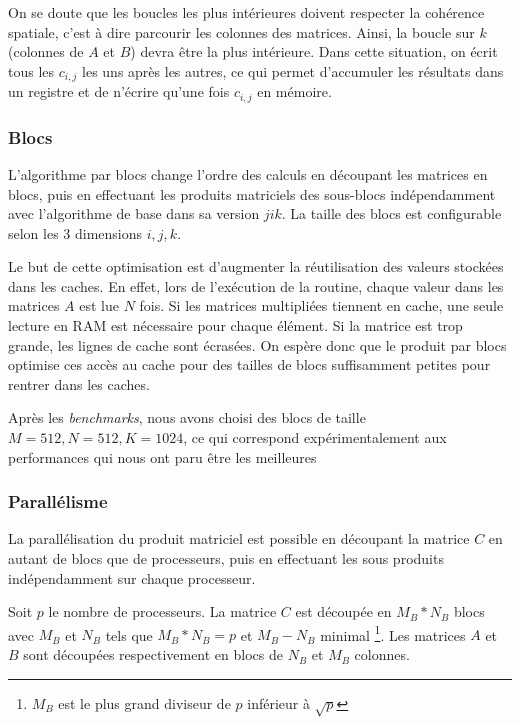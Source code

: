 On se doute que les boucles les plus intérieures doivent respecter la cohérence spatiale, c'est à dire parcourir les colonnes des matrices. Ainsi, la boucle sur $k$ (colonnes de $A$ et $B$) devra être la plus intérieure. Dans cette situation, on écrit tous les $c_{i,j}$ les uns après les autres, ce qui permet d'accumuler les résultats dans un registre et de n'écrire qu'une fois $c_{i,j}$ en mémoire.

\subsubsection{Blocs}\label{sec:algo_bloc}

L'algorithme par blocs change l'ordre des calculs en découpant les matrices en blocs, puis en effectuant les produits matriciels des sous-blocs indépendamment avec l'algorithme de base dans sa version $jik$. La taille des blocs est configurable selon les 3 dimensions $i,j,k$.

Le but de cette optimisation est d'augmenter la réutilisation des valeurs stockées dans les caches. En effet, lors de l'exécution de la routine, chaque valeur dans les matrices $A$ est lue $N$ fois. Si les matrices multipliées tiennent en cache, une seule lecture en RAM est nécessaire pour chaque élément. Si la matrice est trop grande, les lignes de cache sont écrasées. On espère donc que le produit par blocs optimise ces accès au cache pour des tailles de blocs suffisamment petites pour rentrer dans les caches.

Après les \emph{benchmarks}, nous avons choisi des blocs de taille $M=512 , N=512 , K=1024$, ce qui correspond expérimentalement aux performances qui nous ont paru être les meilleures

\subsubsection{Parallélisme}

La parallélisation du produit matriciel est possible en découpant la matrice $C$ en autant de blocs que de processeurs, puis en effectuant les sous produits indépendamment sur chaque processeur.

Soit $p$ le nombre de processeurs. La matrice $C$ est découpée en $M_B*N_B$ blocs avec $M_B$ et $N_B$ tels que $M_B*N_B = p$ et $M_B - N_B$ minimal \footnote{$M_B$ est le plus grand diviseur de $p$ inférieur à $\sqrt p$}. Les matrices $A$ et $B$ sont découpées respectivement en blocs de $N_B$ et $M_B$ colonnes.


